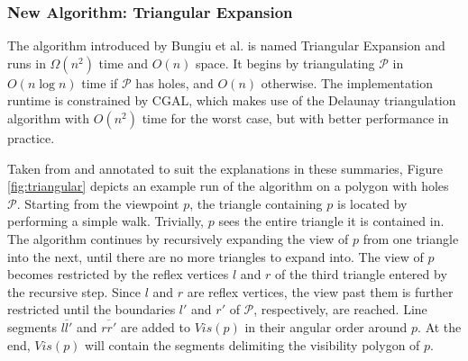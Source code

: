 \subsubsection{New Algorithm: Triangular Expansion}
The algorithm introduced by Bungiu et al. \cite{DBLP:journals/corr/BungiuHHHK14} is named Triangular Expansion and runs in $\Omega(n^2)$ time and $O(n)$ space. It begins by triangulating $\mathcal P$ in $O(n \log n)$ time if $\mathcal P$ has holes, and $O(n)$ otherwise. The implementation runtime is constrained by CGAL, which makes use of the Delaunay triangulation algorithm \cite{delaunay1934sphere} with $O(n^2)$ time for the worst case, but with better performance in practice. 

Taken from \cite{DBLP:journals/corr/BungiuHHHK14} and annotated to suit the explanations in these summaries, Figure \ref{fig:triangular} depicts an example run of the algorithm on a polygon with holes $\mathcal P$. Starting from the viewpoint $p$, the triangle containing $p$ is located by performing a simple walk. Trivially, $p$ sees the entire triangle it is contained in. The algorithm continues by recursively expanding the view of $p$ from one triangle into the next, until there are no more triangles to expand into. The view of $p$ becomes restricted by the reflex vertices $l$ and $r$ of the third triangle entered by the recursive step. Since $l$ and $r$ are reflex vertices, the view past them is further restricted until the boundaries $l'$ and $r'$ of $\mathcal P$, respectively,  are reached. Line segments $\overline{ll'}$ and $\overline{rr'}$ are added to $Vis(p)$ in their angular order around $p$. At the end, $Vis(p)$ will contain the segments delimiting the visibility polygon of $p$.

